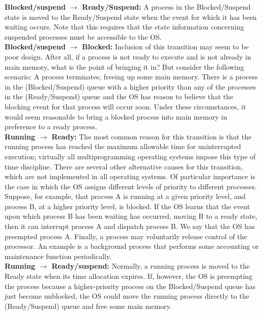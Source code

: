 \documentclass[12pt]{article}
\begin{document}
\begin{enumerate}
{\begin{enumerate}
    \textbf{Blocked/suspend $\rightarrow$ Ready/Suspend:} A process in the Blocked/Suspend state is moved to the Ready/Suspend state when the event for which it has been waiting occurs. Note that this requires that the state information concerning suspended processes must be accessible to the OS.\\
    \textbf{Blocked/suspend $\rightarrow$ Blocked:} Inclusion of this transition may seem to be poor design. After all, if a process is not ready to execute and is not already in main memory, what is the point of bringing it in? But consider the following scenario: A process terminates, freeing up some main memory. There is a process in the (Blocked/Suspend) queue with a higher priority than any of the processes in the (Ready/Suspend) queue and the OS has reason to believe that the blocking event for that process will occur soon. Under these circumstances, it would seem reasonable to bring a blocked process into main memory in preference to a ready process.\\
    \textbf{Running $\rightarrow$ Ready:} The most common reason for this transition is that the running process has reached the maximum allowable time for uninterrupted execution; virtually all multiprogramming operating systems impose this type of time discipline. There are several other alternative causes for this transition, which are not implemented in all operating systems. Of particular importance is the case in which the OS assigns different levels of priority to different processes. Suppose, for example, that process A is running at a given priority level, and process B, at a higher priority level, is blocked. If the OS learns that the event upon which process B has been waiting has occurred, moving B to a ready state, then it can interrupt process A and dispatch process B. We say that the OS has preempted process A. Finally, a process may voluntarily release control of the processor. An example is a background process that performs some accounting or maintenance function periodically.\\
    \textbf{Running $\rightarrow$ Ready/suspend:} Normally, a running process is moved to the Ready state when its time allocation expires. If, however, the OS is preempting the process because a higher-priority process on the Blocked/Suspend queue has just become unblocked, the OS could move the running process directly to the (Ready/Suspend) queue and free some main memory.\\

\end{enumerate}}
\end{enumerate}
\end{document}

